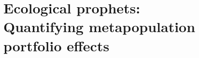 %
%
%
%
\chapter{Ecological prophets:\\Quantifying metapopulation portfolio effects}
%
%
%
%
%
%
%
%
%
% 

%
%
%
%

